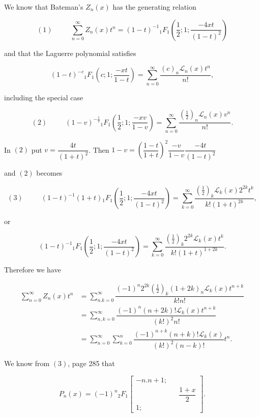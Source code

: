 \begin{solution}
We know that Bateman's $Z_n(x)$ has the generating relation

$$(1) \hspace{30pt} \displaystyle\sum_{n=0}^{\infty} Z_n(x) t^n = (1-t)^{-1} {}_1F_1 \left( \dfrac{1}{2}; 1 ; \dfrac{-4xt}{(1-t)^2} \right)$$

and that the Laguerre polynomial satisfies

$$(1-t)^{-c} {}_1F_1 \left( c;1; \dfrac{-xt}{1-t} \right) = \displaystyle\sum_{n=0}^{\infty} \dfrac{(c)_n \mathscr{L}_n(x) t^n}{n!},$$

including the special case

$$(2) \hspace{30pt} (1-v)^{-\frac{1}{2}} {}_1F_1 \left( \dfrac{1}{2}; 1; \dfrac{-xv}{1-v} \right) = \displaystyle\sum_{n=0}^{\infty} \dfrac{(\frac{1}{2})_n \mathscr{L}_n(x) v^n}{n!}.$$

In $(2)$ put $v = \dfrac{4t}{(1+t)^2}$. Then $1-v = \left( \dfrac{1-t}{1+t} \right)^2 \dfrac{-v}{1-v} \dfrac{-4t}{(1-t)^2}$

and $(2)$ becomes

$$(3) \hspace{30pt} (1-t)^{-1} (1+t) {}_1F_1 \left( \dfrac{1}{2}; 1 ; \dfrac{-4xt}{(1-t)^2} \right) = \displaystyle\sum_{k=0}^{\infty} \dfrac{(\frac{1}{2})_k \mathscr{L}_k(x) 2^{2k} t^k}{k! (1+t)^{2k}},$$

or

$$(1-t)^{-1} {}_1F_1 \left( \dfrac{1}{2}; 1 ; \dfrac{-4xt}{(1-t)^2} \right) = \displaystyle\sum_{k=0}^{\infty} \dfrac{(\frac{1}{2})_k 2^{2k} \mathscr{L}_k(x) t^k}{k! (1+t)^{1+2k}}.$$

Therefore we have

$$\begin{array}{ll}
\displaystyle\sum_{n=0}^{\infty} Z_n(x) t^n &= \displaystyle\sum_{n.k=0}^{\infty} \dfrac{(-1)^n 2^{2k} (\frac{1}{2})_k (1+2k)_n \mathscr{L}_k(x)t^{n+k}}{k! n!} \\
&= \displaystyle\sum_{n,k=0}^{\infty} \dfrac{(-1)^n (n+2k)! \mathscr{L}_k(x) t^{n+k}}{(k!)^2 n!} \\
&= \displaystyle\sum_{n=0}^{\infty} \displaystyle\sum_{k=0}^n \dfrac{(-1)^{n+k} (n+k)! \mathscr{L}_k(x)}{(k!)^2 (n-k)!} t^n.
\end{array}$$

We know from $(3)$, page 285 that

$$P_n(x) = (-1)^n {}_2F_1 \left[ \begin{array}{rlr}
-n. n+1; & & \\
& & \dfrac{1+x}{2} \\
1; & & 
\end{array} \right].$$


\end{solution}
